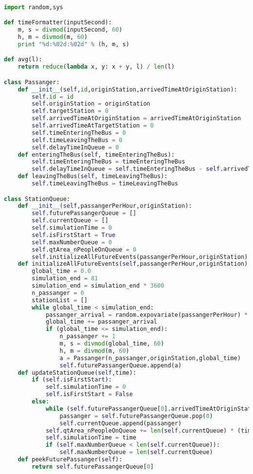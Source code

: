 \documentclass{article}
\begin{document}
 	\begin{lstlisting}[language=Python]

import random,sys

def timeFormatter(inputSecond):
	m, s = divmod(inputSecond, 60)
	h, m = divmod(m, 60)
	print "%d:%02d:%02d" % (h, m, s)

def avg(l):
	return reduce(lambda x, y: x + y, l) / len(l)

class Passanger:
	def __init__(self,id,originStation,arrivedTimeAtOriginStation):
		self.id = id
		self.originStation = originStation
		self.targetStation = 0
		self.arrivedTimeAtOriginStation = arrivedTimeAtOriginStation
		self.arrivedTimeAtTargetStation = 0
		self.timeEnteringTheBus = 0
		self.timeLeavingTheBus = 0
		self.delayTimeInQueue = 0
	def enteringTheBus(self, timeEnteringTheBus):
		self.timeEnteringTheBus = timeEnteringTheBus
		self.delayTimeInQueue = self.timeEnteringTheBus - self.arrivedTimeAtOriginStation
	def leavingTheBus(self, timeLeavingTheBus):
		self.timeLeavingTheBus = timeLeavingTheBus

class StationQueue:
	def __init__(self,passangerPerHour,originStation):
		self.futurePassangerQueue = []
		self.currentQueue = []
		self.simulationTime = 0
		self.isFirstStart = True
		self.maxNumberQueue = 0
		self.qtArea_nPeopleOnQueue = 0
		self.initializeAllFutureEvents(passangerPerHour,originStation)
	def initializeAllFutureEvents(self,passangerPerHour,originStation):
		global_time = 0.0
		simulation_end = 81
		simulation_end = simulation_end * 3600
		n_passanger = 0
		stationList = []
		while global_time < simulation_end:
			passanger_arrival = random.expovariate(passangerPerHour) * 3600
			global_time += passanger_arrival
			if (global_time <= simulation_end):
				n_passanger += 1
				m, s = divmod(global_time, 60)
				h, m = divmod(m, 60)
				a = Passanger(n_passanger,originStation,global_time)
				self.futurePassangerQueue.append(a)
	def updateStationQueue(self,time):
		if (self.isFirstStart):
			self.simulationTime = 0
			self.isFirstStart = False
		else:
			while (self.futurePassangerQueue[0].arrivedTimeAtOriginStation <= time):
				passanger = self.futurePassangerQueue.pop(0)
				self.currentQueue.append(passanger)
			self.qtArea_nPeopleOnQueue += len(self.currentQueue) * (time - self.simulationTime)
			self.simulationTime = time
			if (self.maxNumberQueue < len(self.currentQueue)):
				self.maxNumberQueue = len(self.currentQueue)
	def peekFuturePassanger(self):
		return self.futurePassangerQueue[0]



\end{lstlisting}
\end{document}
